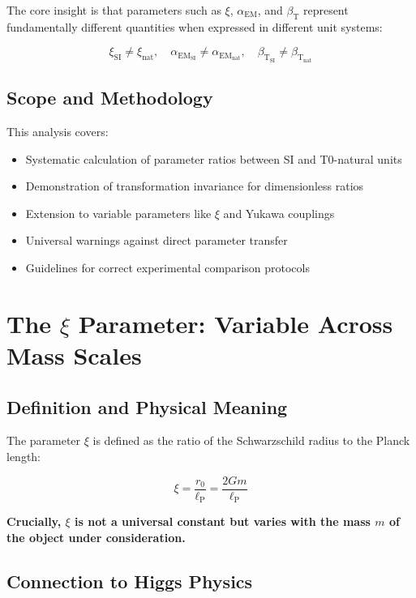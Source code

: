 \documentclass[12pt,a4paper]{article}
\newcommand{\xipar}{\xi}
\newcommand{\alphaEM}{\alpha_{\text{EM}}}
\newcommand{\betaT}{\beta_{\text{T}}}
\newcommand{\lP}{\ell_{\text{P}}}
\begin{document}
	The core insight is that parameters such as $\xipar$, $\alphaEM$, and $\betaT$ represent fundamentally different quantities when expressed in different unit systems:
	
	$$\xipar_{\text{SI}} \neq \xipar_{\text{nat}}, \quad \alphaEM_{\text{SI}} \neq \alphaEM_{\text{nat}}, \quad \betaT_{\text{SI}} \neq \betaT_{\text{nat}}$$
	
	\subsection{Scope and Methodology}
	\label{subsec:scope}
	
	This analysis covers:
	\begin{itemize}
		\item Systematic calculation of parameter ratios between SI and T0-natural units
		\item Demonstration of transformation invariance for dimensionless ratios
		\item Extension to variable parameters like $\xipar$ and Yukawa couplings
		\item Universal warnings against direct parameter transfer
		\item Guidelines for correct experimental comparison protocols
	\end{itemize}
	
	\section{The $\xipar$ Parameter: Variable Across Mass Scales}
	\label{sec:xi_parameter}
	
	\subsection{Definition and Physical Meaning}
	\label{subsec:xi_definition}
	
	The parameter $\xipar$ is defined as the ratio of the Schwarzschild radius to the Planck length:
	
	\begin{equation}
		\xipar = \frac{r_0}{\lP} = \frac{2Gm}{\lP}
		\label{eq:xi_definition}
	\end{equation}
	
	\textbf{Crucially, $\xipar$ is not a universal constant but varies with the mass $m$ of the object under consideration.}
	
	\subsection{Connection to Higgs Physics}
	\label{subsec:xi_higgs_connection}
	
\end{document}
